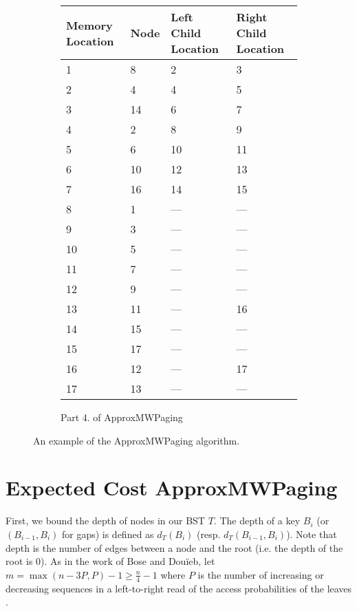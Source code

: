 \documentclass[letterpaper,12pt,titlepage,oneside,final]{book}
\theoremstyle{plain}
\begin{document}
\begin{figure}[H]
\begin{center}
\begin{subfigure}[b]{0.72\textwidth}
\begin{center}
    \begin{tabular}{ | l | l | l | p{5cm} |}
    \hline
    Memory Location & Node & Left Child Location & Right Child Location \\ \hline
    1  & 8  & 2    & 3    \\ \hline
    2  & 4  & 4    & 5    \\ \hline
    3  & 14 & 6    & 7    \\ \hline
    4  & 2  & 8    & 9    \\ \hline
    5  & 6  & 10   & 11   \\ \hline
    6  & 10 & 12   & 13   \\ \hline
    7  & 16 & 14   & 15   \\ \hline
    8  & 1  & --- & --- \\ \hline
    9  & 3  & --- & --- \\ \hline
    10 & 5  & --- & --- \\ \hline
    11 & 7  & --- & --- \\ \hline
    12 & 9  & --- & --- \\ \hline
    13 & 11 & --- & 16   \\ \hline
    14 & 15 & --- & --- \\ \hline
    15 & 17 & --- & --- \\ \hline
    16 & 12 & --- & 17   \\ \hline
    17 & 13 & --- & --- \\ \hline
    \end{tabular}
\end{center}

\caption{Part 4. of ApproxMWPaging}
\end{subfigure}
\end{center}


\caption{An example of the ApproxMWPaging algorithm.}
\end{figure}


\section{Expected Cost ApproxMWPaging} \label{45}

First, we bound the depth of nodes in our BST $T$. The depth of a key $B_i$ (or $(B_{i-1}, B_i)$ for gaps) is defined as $d_T(B_i)$ (resp. $d_T(B_{i-1},B_i)$). Note that depth is the number of edges between a node and the root (i.e. the depth of the root is $0$). As in the work of Bose and Dou\"{i}eb, let $m=\max({n-3P,P})-1 \geq \frac{n}{4} - 1$ where $P$ is the number of increasing or decreasing sequences in a left-to-right read of the access probabilities of the leaves \cite{bose2009efficient}.
\end{document}
